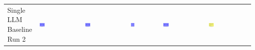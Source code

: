 \begin{table}
\begin{tabularx}{\textwidth}{@{}XXXXXX@{}}
    \makecell{Single LLM \\ Baseline \\ Run 2} & \includegraphics[width=0.13\textwidth]{./run_2/png/gpt-4o_results/MicrofluidicChip.png} & \includegraphics[width=0.13\textwidth]{./run_2/png/o1-preview_results/MicrofluidicChip.png} & \includegraphics[width=0.13\textwidth]{./run_2/png/claude-3-5-sonnet-20240620_results/MicrofluidicChip.png} & \includegraphics[width=0.13\textwidth]{./run_2/png/watsonx_meta-llama_llama-3-1-70b-instruct_results/MicrofluidicChip.png} & \includegraphics[width=0.13\textwidth]{./run_2/png/watsonx_meta-llama_llama-3-405b-instruct_results/MicrofluidicChip.png} \\

\end{tabularx}
\end{table}
